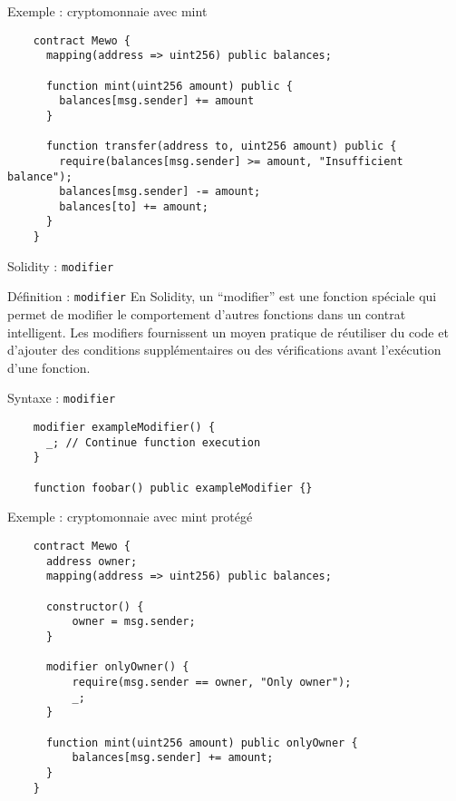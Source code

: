 \begin{frame}[fragile]{Exemple : cryptomonnaie avec mint}
  \begin{verbatim}
    contract Mewo {
      mapping(address => uint256) public balances;

      function mint(uint256 amount) public {
        balances[msg.sender] += amount
      }

      function transfer(address to, uint256 amount) public {
        require(balances[msg.sender] >= amount, "Insufficient balance");
        balances[msg.sender] -= amount;
        balances[to] += amount;
      }
    }
  \end{verbatim}
\end{frame}

\begin{frame}[fragile]{Solidity : \texttt{modifier}}
  \begin{block}{Définition : \texttt{modifier}}
    En Solidity, un \enquote{modifier} est une fonction spéciale qui permet de modifier le comportement d'autres fonctions dans un contrat intelligent.
    Les modifiers fournissent un moyen pratique de réutiliser du code et d'ajouter des conditions supplémentaires ou des vérifications avant l'exécution d'une fonction.
  \end{block}


  \begin{block}{Syntaxe : \texttt{modifier}}
    \begin{verbatim}
    modifier exampleModifier() {
      _; // Continue function execution
    }

    function foobar() public exampleModifier {}
  \end{verbatim}
  \end{block}
\end{frame}

\begin{frame}[fragile]{Exemple : cryptomonnaie avec mint protégé}
  \begin{verbatim}
    contract Mewo {
      address owner;
      mapping(address => uint256) public balances;

      constructor() {
          owner = msg.sender;
      }
    
      modifier onlyOwner() {
          require(msg.sender == owner, "Only owner");
          _;
      }
    
      function mint(uint256 amount) public onlyOwner {
          balances[msg.sender] += amount;
      }
    }
  \end{verbatim}
\end{frame}

